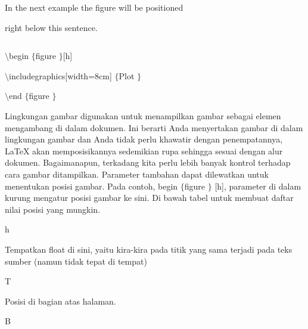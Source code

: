 \vspace{12pt}
\noindent 
{\fontsize{14pt}{14pt}\selectfont In the next example the figure will be positioned  \\} \par
\vspace{14pt}
\noindent 
{\fontsize{14pt}{14pt}\selectfont right below this sentence. \\} \par
\noindent 
{\fontsize{14pt}{14pt}\selectfont  $  $ \\} \par
\noindent 
{\fontsize{14pt}{14pt}\selectfont  $  \setminus $begin $  \{  $figure $  \}  $[h] \\} \par
\vspace{14pt}
\noindent 
{\fontsize{14pt}{14pt}\selectfont  $  \setminus $includegraphics[width=8cm] $  \{  $Plot $  \}  $ \\} \par
\vspace{14pt}
\noindent 
{\fontsize{14pt}{14pt}\selectfont  $  \setminus $end $  \{  $figure $  \}  $ \\} \par
\noindent 
 \hspace*{0.5in} Lingkungan gambar digunakan untuk menampilkan gambar sebagai elemen mengambang di dalam dokumen. Ini berarti Anda menyertakan gambar di dalam lingkungan gambar dan Anda tidak perlu khawatir dengan penempatannya, LaTeX akan memposisikannya sedemikian rupa sehingga sesuai dengan alur dokumen. Bagaimanapun, terkadang kita perlu lebih banyak kontrol terhadap cara gambar ditampilkan. Parameter tambahan dapat dilewatkan untuk menentukan posisi gambar. Pada contoh, begin  $  \{  $figure $  \}  $ [h], parameter di dalam kurung mengatur posisi gambar ke sini. Di bawah tabel untuk membuat daftar nilai posisi yang mungkin. \par
\vspace{14pt}
\vspace{18pt}
\noindent 
h  \par
\noindent 
Tempatkan float di sini, yaitu kira-kira pada titik yang sama terjadi pada teks sumber (namun tidak tepat di tempat) \par
\vspace{12pt}
\noindent 
T \par
\noindent 
 Posisi di bagian atas halaman. \par
\vspace{12pt}
\noindent 
B \par
